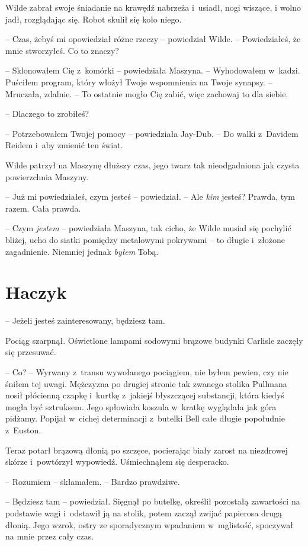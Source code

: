 \documentclass[oneside,polish,11pt,sfheadings]{mwbk}
\begin{document}
Wilde zabrał swoje śniadanie na krawędź nabrzeża i~usiadł, nogi wiszące,
i wolno jadł, rozglądając się. Robot skulił się koło niego.

-- Czas, żebyś mi opowiedział różne rzeczy -- powiedział Wilde. -- Powiedziałeś, że mnie stworzyłeś. Co to znaczy?

-- Sklonowałem Cię z~komórki -- powiedziała Maszyna. -- Wyhodowałem w~kadzi. Puściłem program, który włożył Twoje wspomnienia na Twoje
synapsy. -- Mruczała, zdalnie. -- To ostatnie mogło Cię zabić, więc
zachowaj to dla siebie.

-- Dlaczego to zrobiłeś?

-- Potrzebowałem Twojej pomocy -- powiedziała Jay-Dub. -- Do walki z~Davidem Reidem i~aby zmienić ten świat.

Wilde patrzył na Maszynę dłuższy czas, jego twarz tak nieodgadniona jak
czysta powierzchnia Maszyny.

-- Już mi powiedziałeś, czym jesteś -- powiedział. -- Ale \emph{kim}
jesteś? Prawda, tym razem. Cała prawda.

-- Czym \emph{jestem} -- powiedziała Maszyna, tak cicho, że Wilde musiał
się pochylić bliżej, ucho do siatki pomiędzy metalowymi pokrywami -- to
długie i~złożone zagadnienie. Niemniej jednak \emph{byłem} Tobą.


\chapter{Haczyk}


-- Jeżeli jesteś zainteresowany, będziesz tam.

Pociąg szarpnął. Oświetlone lampami sodowymi brązowe budynki Carlisle
zaczęły się przesuwać.

-- Co? -- Wyrwany z~transu wywołanego pociągiem, nie byłem pewien, czy nie
śniłem tej uwagi. Mężczyzna po drugiej stronie tak zwanego stolika
Pullmana nosił płócienną czapkę i~kurtkę z~jakiejś błyszczącej
substancji, która kiedyś mogła być sztruksem. Jego spłowiała koszula w~kratkę wyglądała jak góra pidżamy. Popijał w~cichej determinacji z~butelki Bell całe długie popołudnie z~Euston.

Teraz potarł brązową dłonią po szczęce, pocierając biały zarost na
niezdrowej skórze i~powtórzył wypowiedź. Uśmiechnąłem się desperacko.

-- Rozumiem -- skłamałem. -- Bardzo prawdziwe.

-- Będziesz tam -- powiedział. Sięgnął po butelkę, określił pozostałą
zawartości na podstawie wagi i~odstawił ją na stolik, potem zaczął
zwijać papierosa drugą dłonią. Jego wzrok, ostry ze sporadycznym
wpadaniem w~mglistość, spoczywał na mnie przez cały czas.
\end{document}
